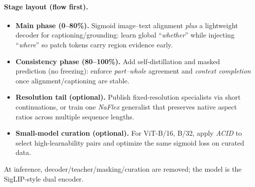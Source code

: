 \begin{enrichment}
\begin{enrichment}
        \paragraph{Stage layout (flow first).}
        \begin{itemize}
            \item \textbf{Main phase (0--80\%).} Sigmoid image--text alignment \emph{plus} a lightweight decoder for captioning/grounding: learn global “\emph{whether}” while injecting “\emph{where}” so patch tokens carry region evidence early.
            \item \textbf{Consistency phase (80--100\%).} Add self-distillation and masked prediction (no freezing): enforce \emph{part--whole} agreement and \emph{context completion} once alignment/captioning are stable.
            \item \textbf{Resolution tail (optional).} Publish fixed-resolution specialists via short continuations, or train one \emph{NaFlex} generalist that preserves native aspect ratios across multiple sequence lengths.
            \item \textbf{Small-model curation (optional).} For ViT-B/16, B/32, apply \emph{ACID} to select high-learnability pairs and optimize the same sigmoid loss on curated data.
        \end{itemize}
        At inference, decoder/teacher/masking/curation are removed; the model is the SigLIP-style dual encoder.
        

\end{enrichment}
\end{enrichment}
